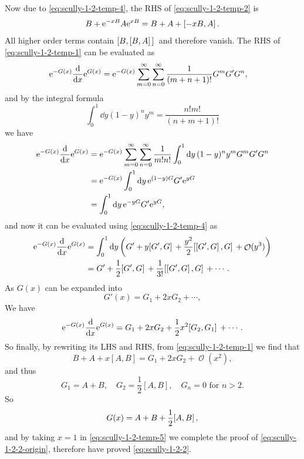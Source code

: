 \documentclass[hyperref, a4paper]{article}
\newcommand*{\ee}{\mathrm{e}}
\DeclareMathOperator{\bigO}{\mathcal{O}}
\begin{document}
Now due to \eqref{eq:scully-1-2-temp-4}, the RHS of \eqref{eq:scully-1-2-temp-2} is 
\[
    B + \ee^{-xB} A \ee^{xB} = B + A + \comm*{-xB}{A}.
\]
All higher order terms contain $\comm*{B}{\comm*{B}{A}}$ and therefore vanish.
The RHS of \eqref{eq:scully-1-2-temp-1} can be evaluated as
\[
    \begin{aligned}
        \ee^{-G(x)} \dv{x} \ee^{G(x)} &= \ee^{-G(x)} \sum_{m=0}^\infty \sum_{n=0}^\infty \frac{1}{(m+n+1)!} G^m G' G^n ,
    \end{aligned}
\]
and by the integral formula 
\[
    \int_{0}^{1} \dd y(1-y)^{n} y^{m}=\frac{n ! m !}{(n+m+1) !}
\]
we have 
\[
    \begin{aligned}
        \ee^{-G(x)} \dv{x} \ee^{G(x)} &= \ee^{-G(x)} \sum_{m=0}^\infty \sum_{n=0}^\infty \frac{1}{m! n!} \int_{0}^{1} \dd{y} (1-y)^{n} y^{m} G^m G' G^n \\
        &= \ee^{-G(x)} \int_{0}^{1} \dd{y} \ee^{(1-y) G} G' \ee^{yG} \\
        &= \int_{0}^{1} \dd{y} \ee^{-y G} G' \ee^{yG} ,
    \end{aligned}
\]
and now it can be evaluated using \eqref{eq:scully-1-2-temp-4} as
\[
    \begin{aligned}
        \ee^{-G(x)} \dv{x} \ee^{G(x)} &= \int_0^1 \dd{y} \left( G' + y \comm*{G'}{G} + \frac{y^2}{2} \comm*{\comm*{G'}{G}}{G} + \bigO(y^3) \right) \\
        &= G' + \frac{1}{2} \comm*{G'}{G}  + \frac{1}{3!} \comm*{\comm*{G'}{G}}{G} + \cdots.
    \end{aligned}
\]
As $G(x)$ can be expanded into
\[
    G'(x) = G_1 + 2x G_2 + \cdots,
\]
We have
\[
    \ee^{-G(x)} \dv{x} \ee^{G(x)} = G_1 + 2 x G_2 + \frac{1}{2} x^2 \comm*{G_2}{G_1} + \cdots.
\]
So finally, by rewriting its LHS and RHS, from \eqref{eq:scully-1-2-temp-1} we find that 
\[
    B + A + x [A, B] = G_1 + 2 x G_2 + \bigO(x^2),
\]
and thus
\[
    G_1 = A + B, \quad G_2 = \frac{1}{2} [A, B], \quad G_{n} = 0 \text{ for $n > 2$}.
\]
So 
\[
    G(x) = A + B + \frac{1}{2} \comm*{A}{B},
\]
and by taking $x=1$ in \eqref{eq:scully-1-2-temp-5} we complete the proof of \eqref{eq:scully-1-2-2-origin}, therefore have proved \eqref{eq:scully-1-2-2}.
\end{document}
